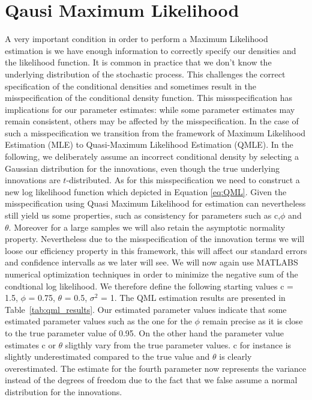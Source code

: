 \documentclass[12pt]{article}
\begin{document}
\section{Qausi Maximum Likelihood}
A very important condition in order to perform a Maximum Likelihood estimation is we have enough information to correctly specify our densities and the likelihood function.
It is common in practice that we don't know the underlying distribution of the stochastic process.
This challenges the correct specification of the conditional densities and sometimes result in the misspecification of the conditional density function.
This missspecification has implications for our parameter estimates: while some parameter estimates may remain consistent, others may be affected by the misspecification.
In the case of such a misspecification we transition from the framework of 
Maximum Likelihood Estimation (MLE) to Quasi-Maximum Likelihood Estimation (QMLE).
In the following, we deliberately assume an incorrect conditional density by selecting a Gaussian distribution for the innovations, even though the true underlying innovations are \( t \)-distributed.
As for this misspecification we need to construct a new log likelihood function which depicted in Equation \ref{eq:QML}.
Given the misspecification using Quasi Maximum Likelihood for estimation can nevertheless still yield us some properties, such as consistency for parameters such as c,$\phi$ and $\theta$. Moreover for a large samples we will also retain the asymptotic normality property.
Nevertheless due to the misspecification of the innovation terms we will loose our efficiency property in this framework, this will affect our standard errors and confidence intervalls as we later will see.
We will now again use MATLABS numerical optimization techniques in order to minimize the negative sum of the condtional log likelihood.
We therefore define the following starting values c = 1.5, $\phi$ = 0.75, $\theta$ = 0.5, $\sigma^2$ = 1.
The QML estimation results are presented in Table~\ref{tab:qml_results}.
Our estimated parameter values indicate that some estimated parameter values such as the one for the  $\phi$ remain precise as it is close to the true parameter value of 0.95. On the other hand the parameter value estimates c or $\theta$ sligthly vary from the true parameter values.
c for instance is slightly underestimated compared to the true value and $\theta$ is clearly overestimated.
The estimate for the fourth parameter now represents the variance instead of the degrees of freedom due to the fact that we false assume a normal distribution for the innovations.
\end{document}
